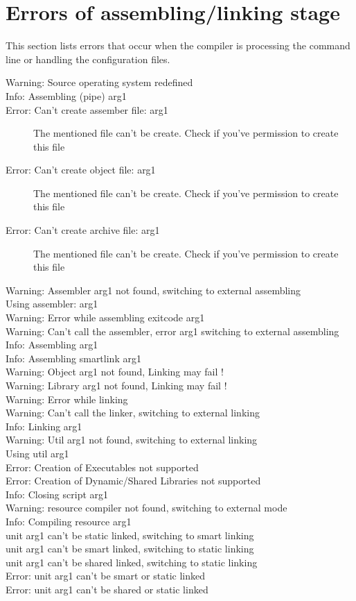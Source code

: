  \section{Errors of assembling/linking stage}
 This section lists errors that occur when the compiler is processing the
 command line or handling the configuration files.
 \begin{description}
\item [Warning: Source operating system redefined]
\item [Info: Assembling (pipe) arg1]
\item [Error: Can't create assember file: arg1]
 The mentioned file can't be create. Check if you've
 permission to create this file
\item [Error: Can't create object file: arg1]
 The mentioned file can't be create. Check if you've
 permission to create this file
\item [Error: Can't create archive file: arg1]
 The mentioned file can't be create. Check if you've
 permission to create this file
\item [Warning: Assembler arg1 not found, switching to external assembling]
\item [Using assembler: arg1]
\item [Warning: Error while assembling exitcode arg1]
\item [Warning: Can't call the assembler, error arg1 switching to external assembling]
\item [Info: Assembling arg1]
\item [Info: Assembling smartlink arg1]
\item [Warning: Object arg1 not found, Linking may fail !]
\item [Warning: Library arg1 not found, Linking may fail !]
\item [Warning: Error while linking]
\item [Warning: Can't call the linker, switching to external linking]
\item [Info: Linking arg1]
\item [Warning: Util arg1 not found, switching to external linking]
\item [Using util arg1]
\item [Error: Creation of Executables not supported]
\item [Error: Creation of Dynamic/Shared Libraries not supported]
\item [Info: Closing script arg1]
\item [Warning: resource compiler not found, switching to external mode]
\item [Info: Compiling resource arg1]
\item [unit arg1 can't be static linked, switching to smart linking]
\item [unit arg1 can't be smart linked, switching to static linking]
\item [unit arg1 can't be shared linked, switching to static linking]
\item [Error: unit arg1 can't be smart or static linked]
\item [Error: unit arg1 can't be shared or static linked]
\end{description}
